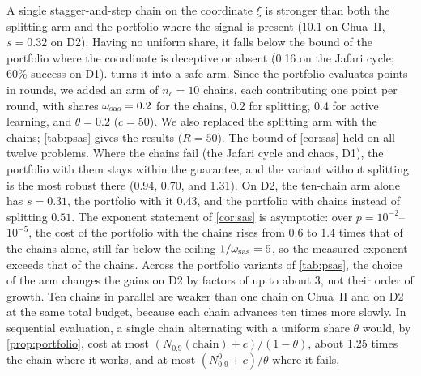 A single stagger-and-step chain on the coordinate $\xi$ is stronger than both the splitting arm and the portfolio where the signal is present (10.1 on Chua~II, $s=0.32$ on D2). Having no uniform share, it falls below the bound of the portfolio where the coordinate is deceptive or absent (0.16 on the Jafari cycle; 60\% success on D1).  turns it into a safe arm. Since the portfolio evaluates points in rounds, we added an arm of $n_c=10$ chains, each contributing one point per round, with shares $\omega_{\rm sas}=0.2$ for the chains, 0.2 for splitting, 0.4 for active learning, and $\theta=0.2$ ($c=50$). We also replaced the splitting arm with the chains; \cref{tab:psas} gives the results ($R=50$). The bound of \cref{cor:sas} held on all twelve problems. Where the chains fail (the Jafari cycle and chaos, D1), the portfolio with them stays within the guarantee, and the variant without splitting is the most robust there (0.94, 0.70, and 1.31). On D2, the ten-chain arm alone has $s=0.31$, the portfolio with it $0.43$, and the portfolio with chains instead of splitting $0.51$. The exponent statement of \cref{cor:sas} is asymptotic: over $p=10^{-2}$--$10^{-5}$, the cost of the portfolio with the chains rises from 0.6 to 1.4 times that of the chains alone, still far below the ceiling $1/\omega_{\rm sas}=5$, so the measured exponent exceeds that of the chains. Across the portfolio variants of \cref{tab:psas}, the choice of the arm changes the gains on D2 by factors of up to about 3, not their order of growth. Ten chains in parallel are weaker than one chain on Chua~II and on D2 at the same total budget, because each chain advances ten times more slowly. In sequential evaluation, a single chain alternating with a uniform share $\theta$ would, by \cref{prop:portfolio}, cost at most $(N_{0.9}(\text{chain})+c)/(1-\theta)$, about 1.25 times the chain where it works, and at most $(N^0_{0.9}+c)/\theta$ where it fails.


